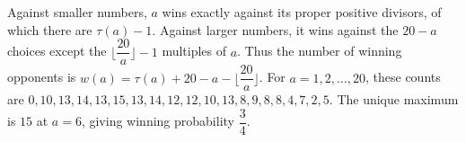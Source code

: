 Against smaller numbers, $a$ wins exactly against its proper positive divisors, of which there are $\tau(a)-1$. Against larger numbers, it wins against the $20-a$ choices except the $\lfloor\dfrac{20}{a}\rfloor-1$ multiples of $a$. Thus the number of winning opponents is $w(a)=\tau(a)+20-a-\lfloor\dfrac{20}{a}\rfloor$. For $a=1,2,\ldots,20$, these counts are $0,10,13,14,13,15,13,14,12,12,10,13,8,9,8,8,4,7,2,5$. The unique maximum is $15$ at $\boxed{a=6}$, giving winning probability $\boxed{\dfrac{3}{4}}$.
